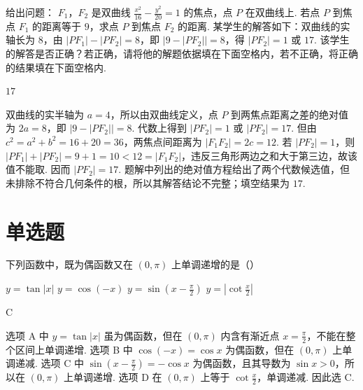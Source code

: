 \begin{problem}
给出问题： \(F_{1}\)，\(F_{2}\) 是双曲线 \( \frac{x^{2}}{16}-\frac{y^{2}}{20}=1 \) 的焦点，点 \(P\) 在双曲线上. 若点 \(P\) 到焦点 \(F_{1}\) 的距离等于 \(9\)，求点 \(P\) 到焦点 \(F_{2}\) 的距离. 某学生的解答如下：双曲线的实轴长为 \(8\)，由 \( \left|PF_{1}\right| - \left|PF_{2}\right| = 8 \)，即 \( \left|9 - \left|PF_{2}\right|\right| = 8 \)，得 \( \left|PF_{2}\right| = 1 \) 或 \(17\). 该学生的解答是否正确？若正确，请将他的解题依据填在下面空格内，若不正确，将正确的结果填在下面空格内\fillinblank{}.
\end{problem}

\begin{answer}
\(17\)
\end{answer}

\begin{solution}
双曲线的实半轴为 \(a=4\)，所以由双曲线定义，点 \(P\) 到两焦点距离之差的绝对值为 \(2a=8\)，即 \(\left|9-|PF_2|\right|=8\). 代数上得到 \(|PF_2|=1\) 或 \(|PF_2|=17\). 但由 \(c^{2}=a^{2}+b^{2}=16+20=36\)，两焦点间距离为 \(|F_1F_2|=2c=12\). 若 \(|PF_2|=1\)，则 \(|PF_1|+|PF_2|=9+1=10<12=|F_1F_2|\)，违反三角形两边之和大于第三边，故该值不能取. 因而 \(|PF_2|=17\). 题解中列出的绝对值方程给出了两个代数候选值，但未排除不符合几何条件的根，所以其解答结论不完整；填空结果为 \(17\).
\end{solution}

\section{单选题}
\begin{problem}
下列函数中，既为偶函数又在 \((0, \pi)\) 上单调递增的是（\quad）

\choices
    {\( y = \tan |x| \)}
    {\( y = \cos (-x) \)}
    {\( y = \sin \left(x - \frac{\pi}{2}\right) \)}
    {\( y = \left|\cot \frac{x}{2}\right| \)}
\end{problem}

\begin{answer}
C
\end{answer}

\begin{solution}
选项 A 中 \(y=\tan|x|\) 虽为偶函数，但在 \((0,\pi)\) 内含有渐近点 \(x=\frac{\pi}{2}\)，不能在整个区间上单调递增. 选项 B 中 \(\cos(-x)=\cos x\) 为偶函数，但在 \((0,\pi)\) 上单调递减. 选项 C 中 \(\sin\left(x-\frac{\pi}{2}\right)=-\cos x\) 为偶函数，且其导数为 \(\sin x>0\)，所以在 \((0,\pi)\) 上单调递增. 选项 D 在 \((0,\pi)\) 上等于 \(\cot\frac{x}{2}\)，单调递减. 因此选 C.
\end{solution}

